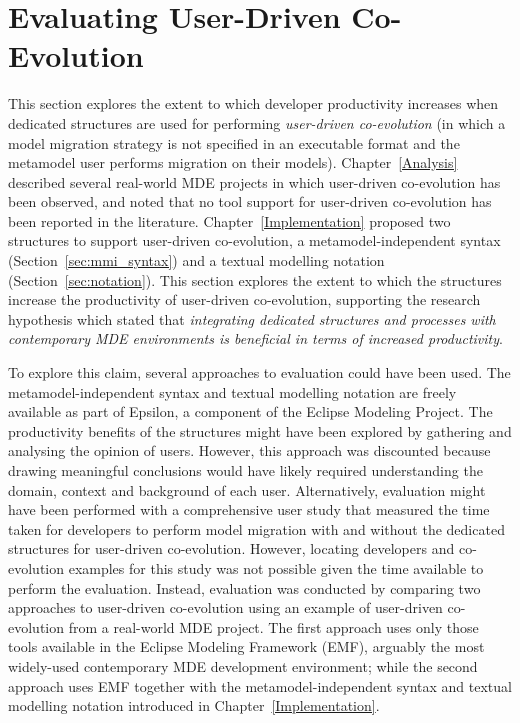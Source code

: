 
\section{Evaluating User-Driven Co-Evolution}
\label{sec:exemplar_user-driven_co-evo}
This section explores the extent to which developer productivity increases when dedicated structures are used for performing \emph{user-driven co-evolution} (in which a model migration strategy is not specified in an executable format and the metamodel user performs migration on their models). Chapter~\ref{Analysis} described several real-world MDE projects in which user-driven co-evolution has been observed, and noted that no tool support for user-driven co-evolution has been reported in the literature. Chapter~\ref{Implementation} proposed two structures to support user-driven co-evolution, a metamodel-independent syntax (Section~\ref{sec:mmi_syntax}) and a textual modelling notation (Section~\ref{sec:notation}). This section explores the extent to which the structures increase the productivity of user-driven co-evolution, supporting the research hypothesis which stated that \emph{integrating dedicated structures and processes with contemporary MDE environments is beneficial in terms of increased productivity}.

To explore this claim, several approaches to evaluation could have been used. The metamodel-independent syntax and textual modelling notation are freely available as part of Epsilon, a component of the Eclipse Modeling Project. The productivity benefits of the structures might have been explored by gathering and analysing the opinion of users. However, this approach was discounted because drawing meaningful conclusions would have likely required understanding the domain, context and background of each user. Alternatively, evaluation might have been performed with a comprehensive user study that measured the time taken for developers to perform model migration with and without the dedicated structures for user-driven co-evolution. However, locating developers and co-evolution examples for this study was not possible given the time available to perform the evaluation. Instead, evaluation was conducted by comparing two approaches to user-driven co-evolution using an example of user-driven co-evolution from a real-world MDE project. The first approach uses only those tools available in the Eclipse Modeling Framework (EMF), arguably the most widely-used contemporary MDE development environment; while the second approach uses EMF together with the metamodel-independent syntax and textual modelling notation introduced in Chapter~\ref{Implementation}.

